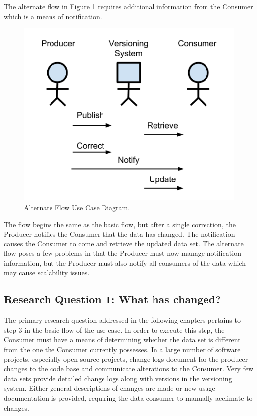 The alternate flow in Figure \ref{UCD2} requires additional information from the Consumer which is a means of notification.
\begin{figure}
	\centering
	\includegraphics[scale=1]{figures/UC_Diagram2.png}
	\caption{Alternate Flow Use Case Diagram.}
	\label{UCD2}
\end{figure}
The flow begins the same as the basic flow, but after a single correction, the Producer notifies the Consumer that the data has changed.
The notification causes the Consumer to come and retrieve the updated data set.
The alternate flow poses a few problems in that the Producer must now manage notification information, but the Producer must also notify all consumers of the data which may cause scalability issues.

\subsection{Research Question 1: What has changed?}

The primary research question addressed in the following chapters pertains to step 3 in the basic flow of the use case.
In order to execute this step, the Consumer must have a means of determining whether the data set is different from the one the Consumer currently possesses.
In a large number of software projects, especially open-source projects, change logs document for the producer changes to the code base and communicate alterations to the Consumer.
Very few data sets provide detailed change logs along with versions in the versioning system.
Either general descriptions of changes are made or new usage documentation is provided, requiring the data consumer to manually acclimate to changes.

